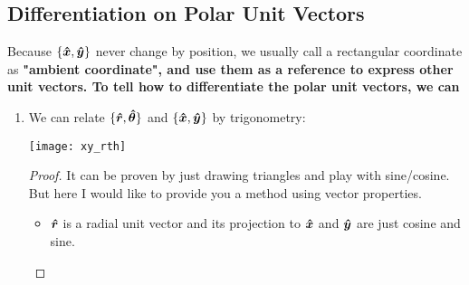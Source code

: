 \documentclass[class=article, crop=false, 12pt]{standalone}
\begin{document}
\subsection{Differentiation on Polar Unit Vectors}

Because $\{\vu*{x}, \vu*{y}\}$ never change by position, 
we usually call a rectangular coordinate as \bf{"ambient coordinate"},
and use them as a reference to express other unit vectors. 
To tell how to differentiate the polar unit vectors, 
we can  

\begin{enumerate}
    \item We can relate $\{\vu*{r}, \vu*{\theta}\}$ and $\{\vu*{x}, \vu*{y}\}$ by trigonometry:
    \begin{center}
        \begin{minipage}{0.4\linewidth}
        \end{minipage}
        \hspace{0.05\textwidth}
        \begin{minipage}{0.3\linewidth}
            \centering
            \texttt{[image: xy\_rth]}
        \end{minipage}
    \end{center}

    \begin{proof}
        It can be proven by just drawing triangles and play with sine/cosine. 
        But here I would like to provide you a method using vector properties.

        \begin{itemize}
            \item $\vu*{r}$ is a radial unit vector and its projection to $\vu*{x}$ and $\vu*{y}$ are just cosine and sine.


\end{itemize}
\end{proof}
\end{enumerate}
\end{document}
